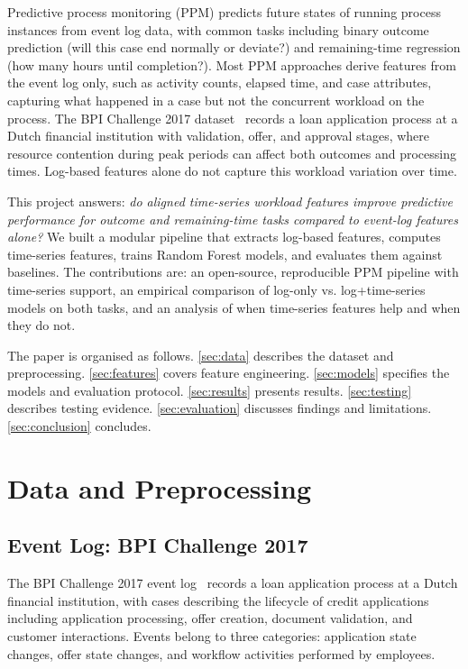 \documentclass[runningheads]{llncs}
\begin{document}
Predictive process monitoring (PPM) predicts future states of running process
instances from event log data, with common tasks including binary
outcome prediction (will this case end normally or deviate?) and remaining-time
regression (how many hours until completion?). Most PPM approaches derive
features from the event log only, such as activity counts, elapsed time, and case
attributes, capturing what happened in a case but not the
concurrent workload on the process. The BPI Challenge 2017
dataset~\cite{bpic2017} records a loan application process at a Dutch
financial institution with validation, offer, and approval stages, where
resource contention during peak periods can affect both
outcomes and processing times. Log-based features alone do not capture
this workload variation over time.

This project answers: \emph{do aligned time-series workload features
improve predictive performance for outcome and remaining-time tasks compared
to event-log features alone?} We built a modular pipeline that extracts
log-based features, computes time-series features, trains Random Forest models,
and evaluates them against baselines. The contributions are: an open-source, reproducible PPM
pipeline with time-series support, an empirical comparison of log-only vs.
log+time-series models on both tasks, and an analysis of when time-series
features help and when they do not.

The paper is organised as follows. \autoref{sec:data} describes the dataset and
preprocessing. \autoref{sec:features} covers feature engineering.
\autoref{sec:models} specifies the models and evaluation protocol.
\autoref{sec:results} presents results. \autoref{sec:testing} describes testing
evidence. \autoref{sec:evaluation} discusses findings and limitations.
\autoref{sec:conclusion} concludes.

\section{Data and Preprocessing}
\label{sec:data}

\subsection{Event Log: BPI Challenge 2017}
\label{sec:bpic2017}
The BPI Challenge 2017 event log~\cite{bpic2017} records a loan application
process at a Dutch financial institution, with cases describing the lifecycle
of credit applications including application processing, offer creation,
document validation, and customer interactions. Events belong to three
categories: application state changes, offer state changes, and workflow
activities performed by employees.
\end{document}
